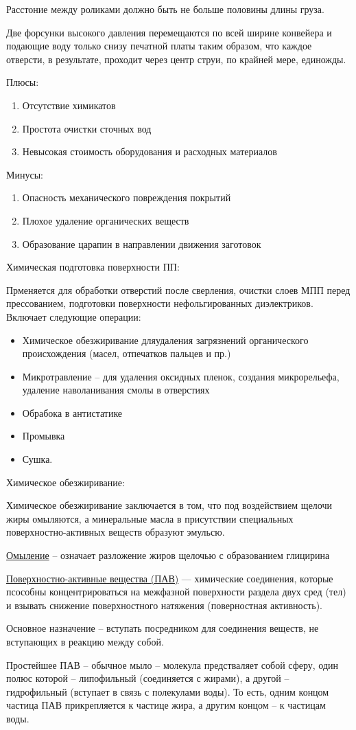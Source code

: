 \documentclass{article}
\begin{document}
Расстоние между роликами должно быть не больше половины длины груза.

Две форсунки высокого давления перемещаются по всей ширине конвейера и подающие воду только снизу печатной платы таким образом, что каждое отверсти, в результате, проходит через центр струи, по крайней мере, единожды.

Плюсы:
\begin{enumerate}
	\item Отсутствие химикатов
	\item Простота очистки сточных вод
	\item Невысокая стоимость оборудования и расходных материалов
\end{enumerate}
Минусы:
\begin{enumerate}
	\item Опасность механического повреждения покрытий
	\item Плохое удаление органических веществ
	\item Образование царапин в направлении движения заготовок
\end{enumerate}

Химическая подготовка поверхности ПП:

Прменяется для обработки отверстий после сверления, очистки слоев МПП перед прессованием, подготовки поверхности нефольгированных диэлектриков. Включает следующие операции:
\begin{itemize}
	\item Химическое обезжиривание дляудаления загрязнений органического происхождения (масел, отпечатков пальцев и пр.)
	\item Микротравление -- для удаления оксидных пленок, создания микрорельефа, удаление наволанивания смолы в отверстиях
	\item Обрабока в антистатике
	\item Промывка
	\item Сушка.
\end{itemize}

Химическое обезжиривание:

Химическое обезжиривание заключается в том, что под воздействием щелочи жиры омыляются, а минеральные масла в присутствии специальных поверхностно-активных веществ образуют эмульсю.

\underline{Омыление} -- означает разложение жиров щелочью с образованием глицирина

\underline{Поверхностно-активные вещества (ПАВ)} --- химические соединения, которые псособны концентрироваться на межфазной поверхности раздела двух сред (тел) и взывать снижение поверхностного натяжения (поверностная активность).

Основное назначение -- вступать посредником для соединения веществ, не вступающих в реакцию между собой.

Простейшее ПАВ -- обычное мыло -- молекула предстваляет собой сферу, один полюс которой -- липофильный (соединяется с жирами), а другой -- гидрофильный (вступает в связь с полекулами воды). То есть, одним концом частица ПАВ прикрепляется к частице жира, а другим концом -- к частицам воды.
\end{document}
